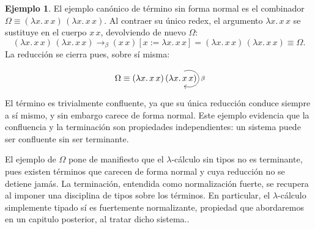 \documentclass[a4paper,12pt]{report}
\theoremstyle{definition}
\newtheorem{example}{Ejemplo}[chapter]
\theoremstyle{plain}
\theoremstyle{remark}
\begin{document}
\begin{example}
  El ejemplo canónico de término sin forma normal es el combinador $\Omega \equiv
  (\lambda x.\, x\,x)\,(\lambda x.\, x\,x)$. Al contraer su único redex, el argumento
  $\lambda x.\, x\,x$ se sustituye en el cuerpo $x\,x$, devolviendo de nuevo $\Omega$:
  \[
  (\lambda x.\, x\,x)\,(\lambda x.\, x\,x) \to_\beta
  (x\,x)[x := \lambda x.\, x\,x] = (\lambda x.\, x\,x)\,(\lambda x.\, x\,x) \equiv \Omega.
  \]
  La reducción se cierra pues, sobre sí misma:
  \[
  \begin{tikzcd}[column sep=3em]
  \Omega \equiv (\lambda x.\, x\,x)\,(\lambda x.\, x\,x) \arrow[loop right, "\beta", distance=2.4em]
  \end{tikzcd}
  \]
  El término es trivialmente confluente, ya que su única reducción conduce siempre a sí mismo,
  y sin embargo carece de forma normal. Este ejemplo evidencia que la confluencia y la
  terminación son propiedades independientes: un sistema puede ser confluente sin ser
  terminante.
\end{example}

El ejemplo de $\Omega$ pone de manifiesto que el $\lambda$-cálculo sin tipos no es terminante, pues existen términos que carecen de forma normal y cuya reducción no se detiene jamás. La terminación, entendida como normalización fuerte, se recupera al imponer una disciplina de tipos sobre los términos. En particular, el $\lambda$-cálculo simplemente tipado sí es fuertemente normalizante, propiedad que abordaremos en un capitulo posterior, al tratar dicho sistema.\citep{geuvers2014, pierce2002}.
\end{document}
